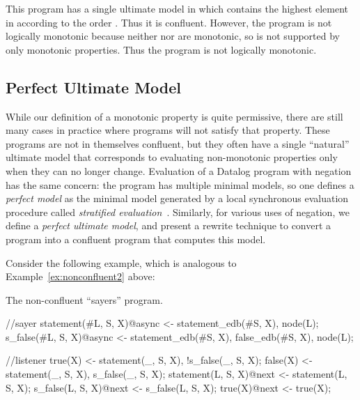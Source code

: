 
This program has a single ultimate model in which  contains the highest
element in  according to the order \dedalus{<}.
Thus it is confluent.  However, the program is not logically monotonic because neither  nor  are monotonic, so  is not supported by only monotonic properties. Thus the program is not logically monotonic.


\subsection{Perfect Ultimate Model}

While our definition of a monotonic property is quite permissive, there are still many cases in practice where programs will not satisfy that property.  These programs are not in themselves confluent, but they often have a single ``natural'' ultimate model that corresponds to evaluating non-monotonic properties only when they can no longer change.  Evaluation of a Datalog program with negation has the same concern: the program has multiple minimal models, so one defines a {\em perfect model} as the minimal model generated by a local synchronous evaluation procedure called {\em stratified evaluation}~\cite{ullmanbook}.
% 
% 
Similarly, for various uses of negation, we define a {\em perfect ultimate model}, and present a rewrite technique to convert a \lang program into a confluent program that computes this model.

Consider the following example, which is analogous to Example~\ref{ex:nonconfluent2} above:

\begin{example}
\label{ex:sayers}
The non-confluent ``sayers'' program.

\begin{Dedalus}
//sayer
statement(#L, S, X)@async <- statement_edb(#S, X),
                             node(L);
s_false(#L, S, X)@async <- statement_edb(#S, X),
                           false_edb(#S, X),
                           node(L);

//listener
true(X) <- statement(_, S, X), !s_false(_, S, X);
false(X) <- statement(_, S, X), s_false(_, S, X);
statement(L, S, X)@next <- statement(L, S, X);
s_false(L, S, X)@next <- s_false(L, S, X);
true(X)@next <- true(X);
\end{Dedalus}
\end{example}

